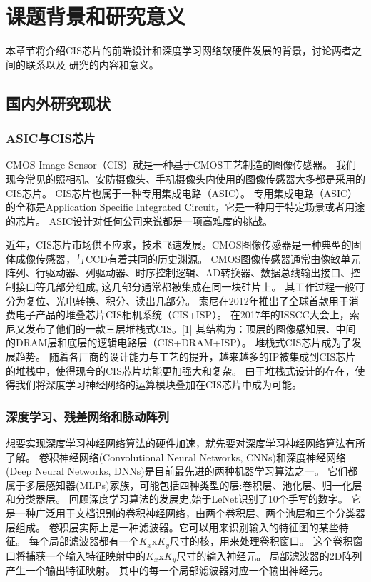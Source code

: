 
\chapter{课题背景和研究意义}

本章节将介绍CIS芯片的前端设计和深度学习网络软硬件发展的背景，讨论两者之间的联系以及
研究的内容和意义。

\section{国内外研究现状}

\subsection{ASIC与CIS芯片}
CMOS Image Sensor（CIS）就是一种基于CMOS工艺制造的图像传感器。
我们现今常见的照相机、安防摄像头、手机摄像头内使用的图像传感器大多都是采用的CIS芯片。
CIS芯片也属于一种专用集成电路（ASIC）。
专用集成电路（ASIC）的全称是Application Specific Integrated Circuit，它是一种用于特定场景或者用途的芯片。
ASIC设计对任何公司来说都是一项高难度的挑战。  

近年，CIS芯片市场供不应求，技术飞速发展。CMOS图像传感器是一种典型的固体成像传感器，与CCD有着共同的历史渊源。
CMOS图像传感器通常由像敏单元阵列、行驱动器、列驱动器、时序控制逻辑、AD转换器、数据总线输出接口、控制接口等几部分组成, 这几部分通常都被集成在同一块硅片上。
其工作过程一般可分为复位、光电转换、积分、读出几部分。  
索尼在2012年推出了全球首款用于消费电子产品的堆叠芯片CIS相机系统（CIS+ISP）。
在2017年的ISSCC大会上，索尼又发布了他们的一款三层堆栈式CIS。[1] %
其结构为：顶层的图像感知层、中间的DRAM层和底层的逻辑电路层（CIS+DRAM+ISP）。
堆栈式CIS芯片成为了发展趋势。
随着各厂商的设计能力与工艺的提升，越来越多的IP被集成到CIS芯片的堆栈中，使得现今的CIS芯片功能更加强大和复杂。
由于堆栈式设计的存在，使得我们将深度学习神经网络的运算模块叠加在CIS芯片中成为可能。  

\subsection{深度学习、残差网络和脉动阵列}
想要实现深度学习神经网络算法的硬件加速，就先要对深度学习神经网络算法有所了解。
卷积神经网络(Convolutional Neural Networks, CNNs)和深度神经网络(Deep Neural Networks, DNNs)是目前最先进的两种机器学习算法之一。%
它们都属于多层感知器(MLPs)家族，可能包括四种类型的层:卷积层、池化层、归一化层和分类器层。%
回顾深度学习算法的发展史,始于LeNet识别了10个手写的数字。
它是一种广泛用于文档识别的卷积神经网络，由两个卷积层、两个池层和三个分类器层组成。
卷积层实际上是一种滤波器。它可以用来识别输入的特征图的某些特征。
每个局部滤波器都有一个$K_x$x$K_y$尺寸的核，用来处理卷积窗口。
这个卷积窗口将捕获一个输入特征映射中的$K_x$x$K_y$尺寸的输入神经元。
局部滤波器的2D阵列产生一个输出特征映射。
其中的每一个局部滤波器对应一个输出神经元。

